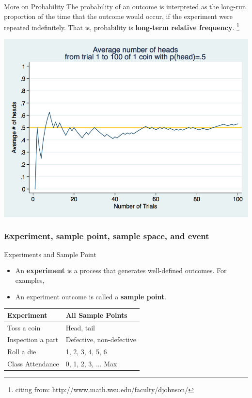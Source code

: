 \documentclass{beamer}
\begin{document}
\begin{frame}{More on Probability}
The probability of an outcome is interpreted as the long-run proportion of the time that the outcome would occur, if the experiment were repeated indefinitely. That is, probability is \textbf{long-term relative frequency}. \footnote{citing from: http://www.math.wsu.edu/faculty/djohnson/}

\begin{center}
\includegraphics[scale=.25]{images/ch3CoinToss.png}

\end{center}


\end{frame}

\subsubsection{Experiment, sample point, sample space, and event}
\begin{frame}{Experiments and Sample Point}

\begin{itemize}
\item An \textbf{experiment} is a process that generates well-defined outcomes. For examples,

\item An experiment outcome is called a \textbf{sample point}.

\end{itemize}

\begin{center}
\begin{tabular}{l|l}
\hline
Experiment        & All Sample Points        \\ \hline
Toss a coin       & Head, tail               \\ \hline
Inspection a part & Defective, non-defective \\ \hline
Roll a die        & 1, 2, 3, 4, 5, 6         \\ \hline
Class Attendance  & 0, 1, 2, 3, ... Max      \\ \hline
\end{tabular}
\end{center}

\end{frame}
\end{document}
